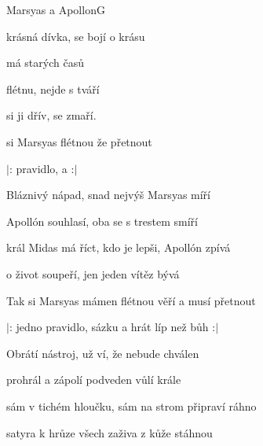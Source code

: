\begin{song}{Marsyas a Apollon}{G}{}

\begin{SBVerse}

 krásná dívka,  se bojí o  krásu

  má  starých  časů

 flétnu,  nejde s  tváří

 si ji  dřív,  se  zmaří.

\end{SBVerse}

\begin{SBChorus}

si Marsyas  flétnou  že  přetnout

$|$:  pravidlo,  a     :$|$

\end{SBChorus}

\begin{SBVerse}

Bláznivý nápad, snad nejvýš Marsyas míří

Apollón souhlasí, oba se s trestem smíří

král Midas má říct, kdo je lepši, Apollón zpívá

o život soupeří, jen jeden vítěz bývá

\end{SBVerse}

\begin{SBChorus}

Tak si Marsyas mámen flétnou věří a musí přetnout

$|$: jedno pravidlo, sázku a hrát líp než bůh :$|$

\end{SBChorus}

\begin{SBVerse}

Obrátí nástroj, už ví, že nebude chválen

prohrál a zápolí podveden vůlí krále

sám v tichém hloučku, sám na strom připraví ráhno

satyra k hrůze všech zaživa z kůže stáhnou

\end{SBVerse}


\end{song}
